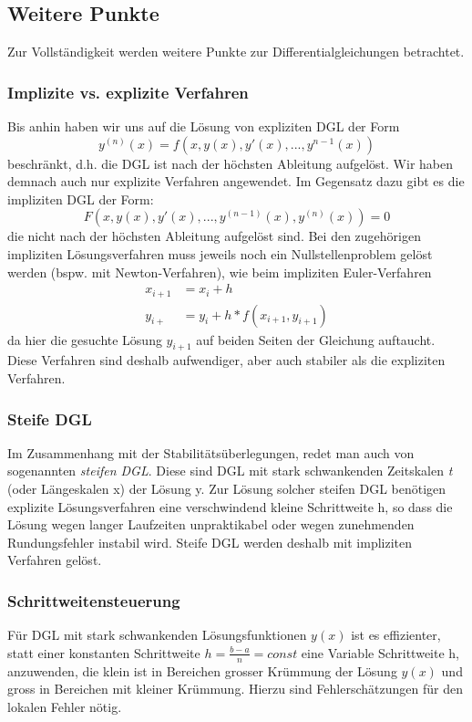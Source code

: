 \documentclass{article}
\theoremstyle{satz}
\theoremstyle{definition}
\begin{document}
\subsection{Weitere Punkte}
Zur Vollständigkeit werden weitere Punkte zur Differentialgleichungen betrachtet.

\subsubsection{Implizite vs. explizite Verfahren}
Bis anhin haben wir uns auf die Lösung von expliziten DGL der Form
\begin{equation}
y^{(n)}(x) = f(x, y(x), y'(x),...,y^{n-1}(x))
\end{equation}
beschränkt, d.h. die DGL ist nach der höchsten Ableitung aufgelöst. Wir haben demnach auch nur explizite Verfahren angewendet. Im Gegensatz dazu gibt es die impliziten DGL der Form:
\begin{equation}
F(x,y(x), y'(x),...,y^{(n-1)}(x), y^{(n)}(x)) = 0
\end{equation}
die nicht nach der höchsten Ableitung aufgelöst sind. Bei den zugehörigen impliziten Lösungsverfahren muss jeweils noch ein Nullstellenproblem gelöst werden (bspw. mit Newton-Verfahren), wie beim impliziten Euler-Verfahren
\begin{equation}
\begin{split}
x_{i+1} &= x_i + h\\
y_{i+} &= y_i+h*f(x_{i+1}, y_{i+1})
\end{split}
\end{equation}
da hier die gesuchte Lösung $y_{i+1}$ auf beiden Seiten der Gleichung auftaucht. Diese Verfahren sind deshalb aufwendiger, aber auch stabiler als die expliziten Verfahren. 

\subsubsection{Steife DGL}
Im Zusammenhang mit der Stabilitätsüberlegungen, redet man auch von sogenannten \textit{steifen DGL}. Diese sind DGL mit stark schwankenden Zeitskalen \textit{t} (oder Längeskalen x) der Lösung y. Zur Lösung solcher steifen DGL benötigen explizite Lösungsverfahren eine verschwindend kleine Schrittweite h, so dass die Lösung wegen langer Laufzeiten unpraktikabel oder wegen zunehmenden Rundungsfehler instabil wird. Steife DGL werden deshalb mit impliziten Verfahren gelöst.

\subsubsection{Schrittweitensteuerung}
Für DGL mit stark schwankenden Lösungsfunktionen $y(x)$ ist es effizienter, statt einer konstanten Schrittweite $h = \frac{b-a}{n} = const$ eine Variable Schrittweite h, anzuwenden, die klein ist in Bereichen grosser Krümmung der Lösung $y(x)$ und gross in Bereichen mit kleiner Krümmung. Hierzu sind Fehlerschätzungen für den lokalen Fehler nötig.
\end{document}
